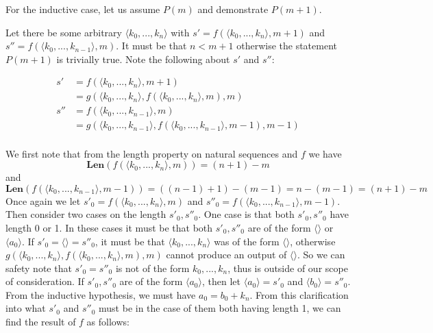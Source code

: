 \documentclass{article}
\newcommand{ \len }[0]{ \textbf{Len} }
\begin{document}
\begin{enumerate}
			\medskip
			
			For the inductive case, let us assume $P(m)$ and demonstrate $P(m + 1)$. 
			
			Let there be some arbitrary $\langle k_0, ..., k_n \rangle$ with $s' = f(\langle k_0, ..., k_n \rangle, m + 1)$ and $s'' = f(\langle k_0, ..., k_{n - 1}\rangle, m)$. It must be that $n < m + 1$ otherwise the statement $P(m + 1)$ is trivially true. Note the following about $s'$ and $s''$:
			
			\begin{align*}
				s' &= f(\langle k_0, ..., k_n \rangle, m + 1)\\
				&= g(\langle k_0, ..., k_n \rangle, f(\langle k_0, ..., k_n \rangle, m), m)\\
				s'' &= f(\langle k_0, ..., k_{n - 1} \rangle, m)\\
				&= g(\langle k_0, ..., k_{n - 1} \rangle, f(\langle k_0, ..., k_{n - 1} \rangle, m - 1),  m - 1)\\
			\end{align*}
			
			We first note that from the length property on natural sequences and $f$ we have $$\len(f(\langle k_0, ..., k_n \rangle, m)) = (n + 1) - m$$ and $$\len(f(\langle k_0, ..., k_{n - 1}\rangle, m - 1)) = ((n - 1) + 1) - (m - 1) = n - (m - 1) = (n + 1) - m$$
			Once again we let $s'_{0} = f(\langle k_0, ..., k_n \rangle, m)$ and $s''_{0} = f(\langle k_0, ..., k_{n - 1} \rangle, m - 1)$. Then consider two cases on the length $s'_{0}, s''_{0}$. One case is that both $s'_{0}, s''_{0}$ have length 0 or 1. In these cases it must be that both $s'_{0}, s''_{0}$ are of the form $\langle \rangle$ or $\langle a_0 \rangle$. If $s'_{0} = \langle \rangle = s''_{0}$, it must be that $\langle k_0, ..., k_n \rangle$ was of the form $\langle \rangle$, otherwise $g(\langle k_0, ..., k_n \rangle, f(\langle k_0, ..., k_n \rangle, m), m)$ cannot produce an output of $\langle \rangle$. So we can safety note that $s'_{0} = s''_{0}$ is not of the form $k_0, ..., k_n$, thus is outside of our scope of consideration. If $s'_{0}, s''_{0}$ are of the form $\langle a_0 \rangle$, then let $\langle a_0 \rangle = s'_{0}$ and $\langle b_0 \rangle = s''_{0}$. From the inductive hypothesis, we must have $a_0 = b_0 + k_n$. From this clarification into what $s'_{0}$ and $s''_{0}$ must be in the case of them both having length 1, we can find the result of $f$ as follows:
			

\end{enumerate}
\end{document}
